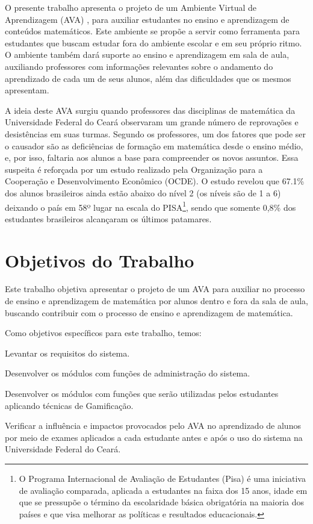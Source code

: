 O presente trabalho apresenta o projeto de um Ambiente Virtual de Aprendizagem (AVA) \cite{valentini2010aprendizagem}, para auxiliar estudantes no ensino e aprendizagem de conteúdos matemáticos. Este 
ambiente se propõe a servir como ferramenta para estudantes que buscam estudar fora do ambiente escolar e em seu próprio ritmo. O ambiente também dará suporte ao ensino e aprendizagem em sala de 
aula, auxiliando professores com informações relevantes sobre o andamento do aprendizado de cada um de seus alunos, além das dificuldades que os mesmos apresentam.

A ideia deste AVA surgiu quando professores das disciplinas de matemática da Universidade Federal do Cear\'a observaram um grande número de reprovações e desistências em suas turmas. Segundo os 
professores, um dos fatores que pode ser o causador são as deficiências de formação em matemática desde o ensino médio, e, por isso, faltaria aos alunos a base para compreender os novos assuntos. Essa 
suspeita é reforçada por um estudo realizado pela Organização para a Cooperação e Desenvolvimento Econômico (OCDE)\cite{pisainfocus2016}. O estudo revelou que 67.1\% dos alunos brasileiros ainda estão 
abaixo do nível 2 (os níveis são de 1 a 6) deixando o país em 58º lugar na escala do PISA\footnote{O Programa Internacional de Avaliação de Estudantes (Pisa) é uma iniciativa de avaliação comparada, 
aplicada a estudantes na faixa dos 15 anos, idade em que se pressupõe o término da escolaridade básica obrigatória na maioria dos países e que visa melhorar as políticas e resultados educacionais.}, 
sendo que somente 0,8\% dos estudantes brasileiros alcançaram os últimos patamares.

\section{Objetivos do Trabalho}

Este trabalho objetiva apresentar o projeto de um AVA para auxiliar no processo de ensino e aprendizagem de matemática por alunos dentro e fora da sala de aula, buscando contribuir com o 
processo de ensino e aprendizagem de matem\'atica. 

Como objetivos específicos para este trabalho, temos: 
\begin{alineas}
  \item Levantar os requisitos do sistema.
  \item Desenvolver os módulos com funções de administração do sistema.
  \item Desenvolver os módulos com funções que serão utilizadas pelos estudantes aplicando técnicas de Gamificação.
  \item Verificar a influência e impactos provocados pelo AVA no aprendizado de alunos por meio de exames aplicados a cada estudante antes e após o uso do sistema na Universidade Federal do Ceará.
\end{alineas}


